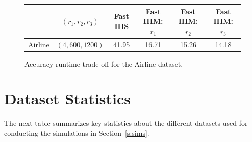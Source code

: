 \documentclass[11pt]{article}
\theoremstyle{definition}
\theoremstyle{plain}
\providecommand{\sectionref}[1]{Section~\ref{#1}}
\begin{document}
\begin{figure}[!htbp]
{\begin{adjustbox}{max width=\textwidth}
\begin{tabular}{l
                    c
                    S[table-format=1.3]
                    S[table-format=1.3]
                    S[table-format=1.3]
                    S[table-format=1.3]}
    & {$(r_1, r_2, r_3)$}
    & {Fast IHS}
    & {Fast IHM: $r_1$}
    & {Fast IHM: $r_2$}
    & {Fast IHM: $r_3$} \\
    \midrule
   Airline
    & $(4,600,1200)$ & 41.95 & 16.71 & 15.26 & 14.18 \\
    \bottomrule
    \end{tabular}
    \end{adjustbox}
   }
    \caption{Accuracy-runtime trade-off for the Airline dataset.}
    \label{fig:simulations_airline}
\end{figure}\hspace{0.01\textwidth}%
\section{Dataset Statistics}
\label{app:statistics}
The next table summarizes key statistics about the different datasets used for conducting the simulations in \sectionref{s:sims}. 
\end{document}
